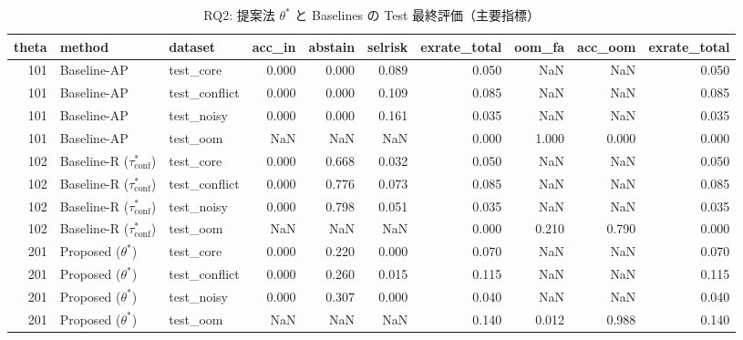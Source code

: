 \begin{table}[t]
\centering
\begin{tabular}{rllrrrrrrr}
\toprule
theta & method & dataset & acc_in & abstain & selrisk & exrate_total & oom_fa & acc_oom & exrate_total \\
\midrule
101 & Baseline-AP & test_core & 0.000 & 0.000 & 0.089 & 0.050 & NaN & NaN & 0.050 \\
101 & Baseline-AP & test_conflict & 0.000 & 0.000 & 0.109 & 0.085 & NaN & NaN & 0.085 \\
101 & Baseline-AP & test_noisy & 0.000 & 0.000 & 0.161 & 0.035 & NaN & NaN & 0.035 \\
101 & Baseline-AP & test_oom & NaN & NaN & NaN & 0.000 & 1.000 & 0.000 & 0.000 \\
102 & Baseline-R ($\tau_{\mathrm{conf}}^\ast$) & test_core & 0.000 & 0.668 & 0.032 & 0.050 & NaN & NaN & 0.050 \\
102 & Baseline-R ($\tau_{\mathrm{conf}}^\ast$) & test_conflict & 0.000 & 0.776 & 0.073 & 0.085 & NaN & NaN & 0.085 \\
102 & Baseline-R ($\tau_{\mathrm{conf}}^\ast$) & test_noisy & 0.000 & 0.798 & 0.051 & 0.035 & NaN & NaN & 0.035 \\
102 & Baseline-R ($\tau_{\mathrm{conf}}^\ast$) & test_oom & NaN & NaN & NaN & 0.000 & 0.210 & 0.790 & 0.000 \\
201 & Proposed ($\theta^\ast$) & test_core & 0.000 & 0.220 & 0.000 & 0.070 & NaN & NaN & 0.070 \\
201 & Proposed ($\theta^\ast$) & test_conflict & 0.000 & 0.260 & 0.015 & 0.115 & NaN & NaN & 0.115 \\
201 & Proposed ($\theta^\ast$) & test_noisy & 0.000 & 0.307 & 0.000 & 0.040 & NaN & NaN & 0.040 \\
201 & Proposed ($\theta^\ast$) & test_oom & NaN & NaN & NaN & 0.140 & 0.012 & 0.988 & 0.140 \\
\bottomrule
\end{tabular}

\caption{RQ2: 提案法 $\theta^*$ と Baselines の Test 最終評価（主要指標）}
\label{tab:rq2_test_overall}
\end{table}
